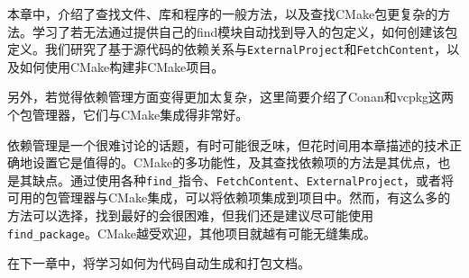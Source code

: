 本章中，介绍了查找文件、库和程序的一般方法，以及查找CMake包更复杂的方法。学习了若无法通过提供自己的find模块自动找到导入的包定义，如何创建该包定义。我们研究了基于源代码的依赖关系与\texttt{ExternalProject}和\texttt{FetchContent}，以及如何使用CMake构建非CMake项目。

另外，若觉得依赖管理方面变得更加太复杂，这里简要介绍了Conan和vcpkg这两个包管理器，它们与CMake集成得非常好。

依赖管理是一个很难讨论的话题，有时可能很乏味，但花时间用本章描述的技术正确地设置它是值得的。CMake的多功能性，及其查找依赖项的方法是其优点，也是其缺点。通过使用各种\texttt{find\_}指令、\texttt{FetchContent}、\texttt{ExternalProject}，或者将可用的包管理器与CMake集成，可以将依赖项集成到项目中。然而，有这么多的方法可以选择，找到最好的会很困难，但我们还是建议尽可能使用\texttt{find\_package}。CMake越受欢迎，其他项目就越有可能无缝集成。

在下一章中，将学习如何为代码自动生成和打包文档。